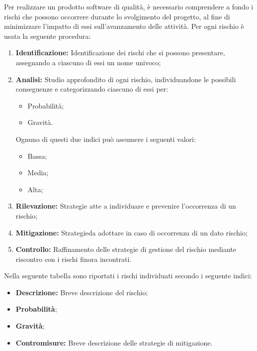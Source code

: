 Per realizzare un prodotto software di {qualità}, è necessario
comprendere a fondo i rischi che possono occorrere durante lo svolgimento
del progetto, al fine di minimizzare l'impatto di essi sull'avanzamento
delle {attività}. \newline
Per ogni rischio è usata la seguente procedura:
\begin{enumerate}
    \item \textbf{Identificazione: }
           Identificazione dei rischi che si possono presentare, assegnando a ciascuno di essi un nome univoco;
    \item \textbf{Analisi: } Studio approfondito di ogni rischio, individuandone le possibili conseguenze e categorizzando ciascuno di essi per:
           \begin{itemize}
               \item Probabilità;
               \item Gravità.
           \end{itemize}
           Ognuno di questi due indici può assumere i seguenti valori:
           \begin{itemize}
               \item Bassa;
               \item Media;
               \item Alta;
           \end{itemize}
    \item \textbf{Rilevazione: }Strategie atte a individuare e prevenire l'occorrenza di un rischio;
    \item \textbf{Mitigazione: }{Strategie}\space da adottare in caso di occorrenza di un dato rischio;
    \item \textbf{Controllo: }Raffinamento delle strategie di gestione del rischio mediante riscontro con i rischi
                              finora incontrati.
\end{enumerate}                         
Nella seguente tabella sono riportati i rischi individuati secondo i seguente indici:
\begin{itemize}
	\item \textbf{Descrizione: }Breve descrizione del rischio; 
	\item \textbf{Probabilità};
    \item \textbf{Gravità};
    \item \textbf{Contromisure: }Breve descrizione delle strategie di mitigazione.

\end{itemize}

